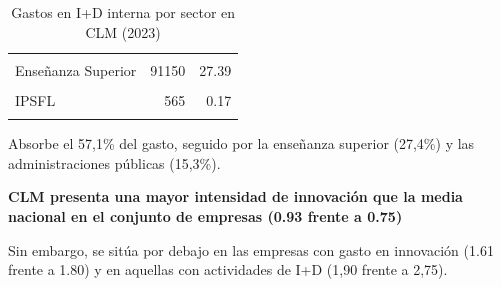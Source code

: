 \documentclass[
  10pt,
  a4paper,
  DIV=11,
  numbers=noendperiod]{scrreprt}
\begin{document}
\begin{table}[!h]
\centering
\caption{Gastos en I+D interna por sector en CLM (2023)}
\centering
\begin{tabular}[t]{lrr}
\toprule
\cellcolor[HTML]{FFF2CC}{Sector} & \cellcolor[HTML]{FFF2CC}{Gasto} & \cellcolor[HTML]{FFF2CC}{Porcentaje}\\
\midrule
\cellcolor{gray!10}{Adm. Públicas} & \cellcolor{gray!10}{51041} & \cellcolor{gray!10}{15.34}\\
Enseñanza Superior & 91150 & 27.39\\
\cellcolor{gray!10}{Empresas} & \cellcolor{gray!10}{190075} & \cellcolor{gray!10}{57.11}\\
IPSFL & 565 & 0.17\\
\cellcolor{gray!10}{Total} & \cellcolor{gray!10}{332831} & \cellcolor{gray!10}{100.00}\\
\bottomrule
\end{tabular}
\end{table}

\begin{tcolorbox}[enhanced jigsaw, leftrule=.75mm, breakable, toptitle=1mm, colframe=quarto-callout-note-color-frame, left=2mm, colback=white, bottomrule=.15mm, title=\textcolor{quarto-callout-note-color}{\faInfo}\hspace{0.5em}{El sector empresarial concentra el mayor esfuerzo en I+D en CLM.}, arc=.35mm, coltitle=black, colbacktitle=quarto-callout-note-color!10!white, toprule=.15mm, bottomtitle=1mm, opacityback=0, titlerule=0mm, rightrule=.15mm, opacitybacktitle=0.6]

Absorbe el 57,1\% del gasto, seguido por la enseñanza superior (27,4\%)
y las administraciones públicas (15,3\%).

\end{tcolorbox}

{\textbf{CLM presenta una mayor intensidad de innovación que la media
nacional en el conjunto de empresas (0.93 frente a 0.75)}}

Sin embargo, se sitúa por debajo en las empresas con gasto en innovación
(1.61 frente a 1.80) y en aquellas con actividades de I+D (1,90 frente a
2,75).
\end{document}

